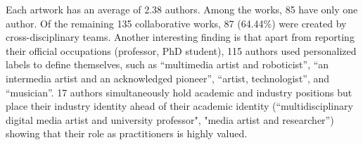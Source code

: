 Each artwork has an average of 2.38 authors. Among the \ncorpus works, 85 have only one author. Of the remaining 135 collaborative works, 87 (64.44\%) were created by cross-disciplinary teams.
Another interesting finding is that apart from reporting their official occupations (\eg professor, PhD student), 115 authors used personalized labels to define themselves, such as ``multimedia artist and roboticist'', ``an intermedia artist and an acknowledged pioneer'', ``artist, technologist'', and ``musician''.
17 authors simultaneously hold academic and industry positions but place their industry identity ahead of their academic identity (\eg ``multidisciplinary digital media artist and university professor", "media artist and researcher'') showing that their role as practitioners is highly valued.


